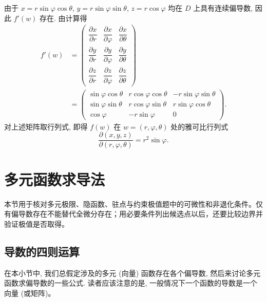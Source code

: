 \documentclass[UTF8,12pt,a4paper,fontset=fandol]{ctexart}
\begin{document}
\begin{solve}\quad 由于 $x=r\sin\varphi\cos\theta$, $y=r\sin\varphi\sin\theta$, $z=r\cos\varphi$ 均在 $D$ 上具有连续偏导数, 因此 $f'(w)$ 存在. 由计算得
\[
\begin{aligned}
  f'(w)
  &=
  \begin{pmatrix}
    \dfrac{\partial x}{\partial r}&\dfrac{\partial x}{\partial\varphi}&\dfrac{\partial x}{\partial\theta}\\
    \dfrac{\partial y}{\partial r}&\dfrac{\partial y}{\partial\varphi}&\dfrac{\partial y}{\partial\theta}\\
    \dfrac{\partial z}{\partial r}&\dfrac{\partial z}{\partial\varphi}&\dfrac{\partial z}{\partial\theta}
  \end{pmatrix}\\
  &=
  \begin{pmatrix}
    \sin\varphi\cos\theta&r\cos\varphi\cos\theta&-r\sin\varphi\sin\theta\\
    \sin\varphi\sin\theta&r\cos\varphi\sin\theta&r\sin\varphi\cos\theta\\
    \cos\varphi&-r\sin\varphi&0
  \end{pmatrix}.
\end{aligned}
\]
对上述矩阵取行列式, 即得 $f(w)$ 在 $w=(r,\varphi,\theta)$ 处的雅可比行列式
\[
  \frac{\partial(x,y,z)}{\partial(r,\varphi,\theta)}=r^2\sin\varphi.
\]

\end{solve}


\section{多元函数求导法}\label{course-14-2}
本节用于核对多元极限、隐函数、驻点与约束极值题中的可微性和非退化条件。仅有偏导数存在不能替代全微分存在；用必要条件列出候选点以后，还要比较边界并验证极值是否取得。

\subsection{导数的四则运算}

在本小节中, 我们总假定涉及的多元 (向量) 函数存在各个偏导数, 然后来讨论多元函数求偏导数的一些公式. 读者应该注意的是, 一般情况下一个函数的导数是一个向量 (或矩阵)。
\end{document}
